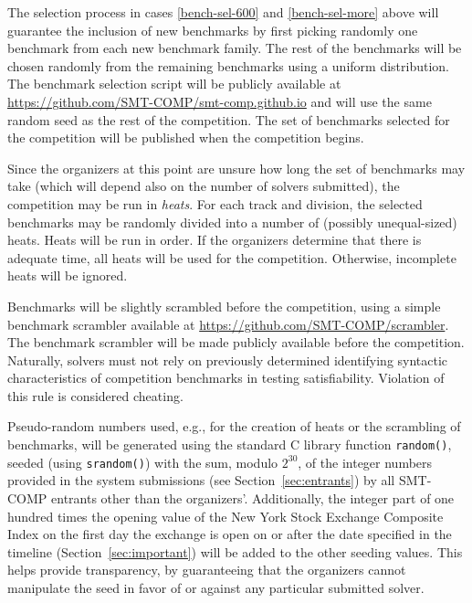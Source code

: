 \documentclass[12pt]{article}
\begin{document}
%
The selection process in cases \ref{bench-sel-600} and \ref{bench-sel-more}
above will guarantee the inclusion of new benchmarks by first picking randomly
one benchmark from each new benchmark family.  The rest of the benchmarks will
be chosen randomly from the remaining benchmarks using a uniform distribution.
%
The benchmark selection script will be publicly available at
\url{https://github.com/SMT-COMP/smt-comp.github.io} and
will use the same random seed as the rest of the competition.  The set of
benchmarks selected for the competition will be published when the competition
begins.

%
Since the organizers at this point are unsure how long the set of
benchmarks may take (which will depend also on the number of solvers
submitted), the competition may be run in \emph{heats}.  For each
track and division, the selected benchmarks may be randomly divided
into a number of (possibly unequal-sized) heats.  Heats will be run in
order.  If the organizers determine that there is adequate time, all
heats will be used for the competition.  Otherwise, incomplete heats
will be ignored.

%
Benchmarks will be slightly scrambled before the competition, using a simple
benchmark scrambler available at \url{https://github.com/SMT-COMP/scrambler}.
The benchmark scrambler will be made publicly available before the competition.
%
Naturally, solvers must not rely on previously determined identifying
syntactic characteristics of competition benchmarks in testing
satisfiability.  Violation of this rule is considered cheating.

%
Pseudo-random numbers used, e.g., for the creation of heats or the
scrambling of benchmarks, will be generated using the standard C
library function \texttt{random()}, seeded (using \texttt{srandom()})
with the sum, modulo $2^{30}$, of the integer numbers provided in the
system submissions (see Section~\ref{sec:entrants}) by all SMT-COMP
entrants other than the organizers'.  Additionally, the integer part
of one hundred times the opening value of the New York Stock Exchange
Composite Index on
the first day the exchange is open on or after the date specified in
the timeline (Section~\ref{sec:important}) will be added to the other
seeding values. This helps provide transparency, by guaranteeing that
the organizers cannot manipulate the seed in favor of or against any
particular submitted solver.

\end{document}
